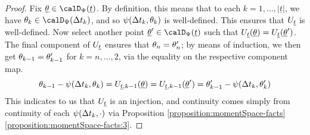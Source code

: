 \begin{proof}
  \label{proof:proposition:twist-to-moment}
  Fix $\underline\twistVar \in \momentSpace(\underline t)$.
  By definition, this means that to each $k = 1, \ldots, |\underline t|$, we have $\twistVar_k \in \momentSpace(\Delta t_k)$, and so $\psi(\Delta t_k, \theta_k)$ is well-defined.
  This ensures that $U_{\underline t}$ is well-defined.
  Now select another point $\underline\twistVar' \in \momentSpace(\underline t)$ such that $U_{\underline t}(\underline{\theta}) = U_{\underline t}(\underline{\theta}')$.
  The final component of $U_{\underline t}$ ensures that $\theta_n = \theta_n'$; by means of induction, we then get $\theta_{k-1} = \theta_{k-1}'$ for $k = n, \ldots, 2$, via the equality on the respective component map.
  \begin{equation*}
    \theta_{k-1} - \psi(\Delta t_k, \theta_k) = U_{\underline t,k-1}(\underline{\theta}) = U_{\underline t,k-1}(\underline{\theta}')   = \theta_{k-1}' - \psi(\Delta t_k, \theta_k')
  \end{equation*}
  This indicates to us that $U_{\underline t}$ is an injection, and continuity comes simply from continuity of each $\psi(\Delta t_k, \cdot)$ via Proposition \ref{proposition:momentSpace-facts}\ref{proposition:momentSpace-facts:3}.


\end{proof}
